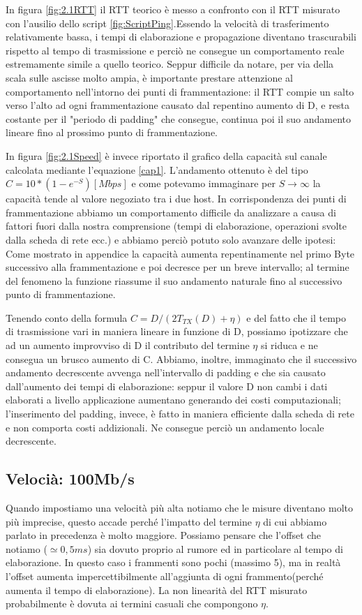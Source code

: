 \documentclass{exam}
\begin{document}
In figura \ref{fig:2.1RTT} il RTT teorico è messo a confronto con il RTT misurato con l'ausilio dello script \ref{fig:ScriptPing}.Essendo la velocità di trasferimento relativamente bassa, i tempi di elaborazione e propagazione diventano trascurabili rispetto al tempo di trasmissione e perciò ne consegue un comportamento reale estremamente simile a quello teorico. Seppur difficile da notare, per via della scala sulle ascisse molto ampia, è importante prestare attenzione al comportamento nell'intorno dei punti di frammentazione: il RTT compie un salto verso l'alto ad ogni frammentazione causato dal repentino aumento di D, e resta costante per il "periodo di padding" che consegue, continua poi il suo andamento lineare fino al prossimo punto di frammentazione.

In figura \ref{fig:2.1Speed} è invece riportato il grafico della capacità sul canale calcolata mediante l'equazione \ref{cap1}. L'andamento ottenuto è del tipo $C = 10*(1 - e^{-S})[Mbps]$ e come potevamo immaginare per $S\to\infty$ la capacità tende al valore negoziato tra i due host. In corrispondenza dei punti di frammentazione abbiamo un comportamento difficile da analizzare a causa di fattori fuori dalla nostra comprensione (tempi di elaborazione, operazioni svolte dalla scheda di rete ecc.) e abbiamo perciò potuto solo avanzare delle ipotesi:
Come mostrato in appendice la capacità aumenta repentinamente nel primo Byte successivo alla frammentazione e poi decresce per un breve intervallo; al termine del fenomeno la funzione riassume il suo andamento naturale fino al successivo punto di frammentazione.

Tenendo conto della formula $C = D/{(2T_{TX}(D) +\eta)}$ e del fatto che il tempo di trasmissione vari in maniera lineare in funzione di D, possiamo ipotizzare che ad un aumento improvviso di D il contributo del termine $\eta$ si riduca e ne consegua un brusco aumento di C. Abbiamo, inoltre, immaginato che il successivo andamento decrescente avvenga nell'intervallo di padding e che sia causato dall'aumento dei tempi di elaborazione: seppur il valore D non cambi i dati elaborati a livello applicazione aumentano generando dei costi computazionali; l'inserimento del padding, invece, è fatto in maniera efficiente dalla scheda di rete e non comporta costi addizionali. Ne consegue perciò un andamento locale decrescente.


\subsection{Velocià: 100Mb/s}
Quando impostiamo una velocità più alta notiamo che le misure diventano molto più imprecise, questo accade perché l'impatto del termine $\eta$ di cui abbiamo parlato in precedenza è molto maggiore. Possiamo pensare che l'offset che notiamo ($\simeq 0,5 ms$) sia dovuto proprio al rumore ed in particolare al tempo di elaborazione. In questo caso i frammenti sono pochi (massimo 5), ma in realtà l'offset aumenta impercettibilmente all'aggiunta di ogni frammento(perché aumenta il tempo di elaborazione). La non linearità del RTT misurato probabilmente è dovuta ai termini casuali che compongono $\eta$.
\end{document}
